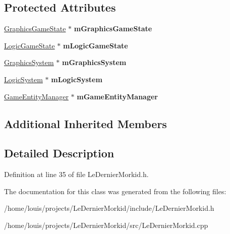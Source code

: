 \subsection*{Protected Attributes}
\begin{DoxyCompactItemize}
\item 
\mbox{\label{class_le_dernier_morkid_a23be96bb6393f265e43dfb8f264437ae}} 
\hyperlink{class_graphics_game_state}{Graphics\+Game\+State} $\ast$ {\bfseries m\+Graphics\+Game\+State}
\item 
\mbox{\label{class_le_dernier_morkid_af8d20b6c7fab7adcc3d2abadc26fe37d}} 
\hyperlink{class_logic_game_state}{Logic\+Game\+State} $\ast$ {\bfseries m\+Logic\+Game\+State}
\item 
\mbox{\label{class_le_dernier_morkid_a45fcb3ad212fe7736cb5760e2c33c6e6}} 
\hyperlink{class_common_1_1_graphics_system}{Graphics\+System} $\ast$ {\bfseries m\+Graphics\+System}
\item 
\mbox{\label{class_le_dernier_morkid_abdf1e8dbee68f3d5aa98f059e0315465}} 
\hyperlink{class_common_1_1_logic_system}{Logic\+System} $\ast$ {\bfseries m\+Logic\+System}
\item 
\mbox{\label{class_le_dernier_morkid_a361bc714a10d219778d4f52d1f8cdb63}} 
\hyperlink{class_common_1_1_game_entity_manager}{Game\+Entity\+Manager} $\ast$ {\bfseries m\+Game\+Entity\+Manager}
\end{DoxyCompactItemize}
\subsection*{Additional Inherited Members}


\subsection{Detailed Description}


Definition at line 35 of file Le\+Dernier\+Morkid.\+h.



The documentation for this class was generated from the following files\+:\begin{DoxyCompactItemize}
\item 
/home/louis/projects/\+Le\+Dernier\+Morkid/include/Le\+Dernier\+Morkid.\+h\item 
/home/louis/projects/\+Le\+Dernier\+Morkid/src/Le\+Dernier\+Morkid.\+cpp\end{DoxyCompactItemize}
